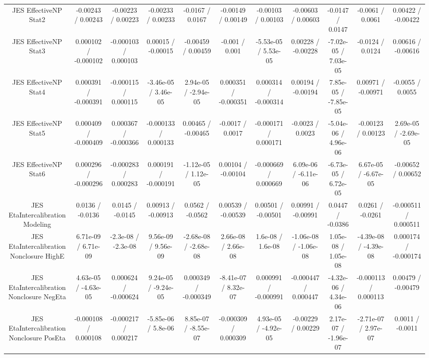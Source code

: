 \begin{table}[htbp]
\begin{center}
\begin{tabular}{|c|c|c|c|c|c|c|c|c|c|c|}
  JES EffectiveNP Stat2 & -0.00243 / 0.00243 & -0.00223 / 0.00223 & -0.00233 / 0.00233 & -0.0167 / 0.0167 & -0.00149 / 0.00149 & -0.00103 / 0.00103 & -0.00603 / 0.00603 & -0.0147 / 0.0147 & -0.0061 / 0.0061 & 0.00422 / -0.00422 \\ 
  JES EffectiveNP Stat3 & 0.000102 / -0.000102 & -0.000103 / 0.000103 & 0.00015 / -0.00015 & -0.00459 / 0.00459 & -0.001 / 0.001 & -5.53e-05 / 5.53e-05 & 0.00228 / -0.00228 & -7.02e-05 / 7.03e-05 & -0.0124 / 0.0124 & 0.00616 / -0.00616 \\ 
  JES EffectiveNP Stat4 & 0.000391 / -0.000391 & -0.000115 / 0.000115 & -3.46e-05 / 3.46e-05 & 2.94e-05 / -2.94e-05 & 0.000351 / -0.000351 & 0.000314 / -0.000314 & 0.00194 / -0.00194 & 7.85e-05 / -7.85e-05 & 0.00971 / -0.00971 & -0.0055 / 0.0055 \\ 
  JES EffectiveNP Stat5 & 0.000409 / -0.000409 & 0.000367 / -0.000366 & -0.000133 / 0.000133 & 0.00465 / -0.00465 & -0.0017 / 0.0017 & -0.000171 / 0.000171 & -0.0023 / 0.0023 & -5.04e-06 / 4.96e-06 & -0.00123 / 0.00123 & 2.69e-05 / -2.69e-05 \\ 
  JES EffectiveNP Stat6 & 0.000296 / -0.000296 & -0.000283 / 0.000283 & 0.000191 / -0.000191 & -1.12e-05 / 1.12e-05 & 0.00104 / -0.00104 & -0.000669 / 0.000669 & 6.09e-06 / -6.11e-06 & -6.73e-05 / 6.72e-05 & 6.67e-05 / -6.67e-05 & -0.00652 / 0.00652 \\ 
  JES EtaIntercalibration Modeling & 0.0136 / -0.0136 & 0.0145 / -0.0145 & 0.00913 / -0.00913 & 0.0562 / -0.0562 & 0.00539 / -0.00539 & 0.00501 / -0.00501 & 0.00991 / -0.00991 & 0.0447 / -0.0386 & 0.0261 / -0.0261 & -0.000511 / 0.000511 \\ 
  JES EtaIntercalibration Nonclosure HighE & 6.71e-09 / 6.71e-09 & -2.3e-08 / -2.3e-08 & 9.56e-09 / 9.56e-09 & -2.68e-08 / -2.68e-08 & 2.66e-08 / 2.66e-08 & 1.6e-08 / 1.6e-08 & -1.06e-08 / -1.06e-08 & 1.05e-08 / 1.05e-08 & -4.39e-08 / -4.39e-08 & 0.000174 / -0.000174 \\ 
  JES EtaIntercalibration Nonclosure NegEta & 4.63e-05 / -4.63e-05 & 0.000624 / -0.000624 & 9.24e-05 / -9.24e-05 & 0.000349 / -0.000349 & -8.41e-07 / 8.32e-07 & 0.000991 / -0.000991 & -0.000447 / 0.000447 & -4.32e-06 / 4.34e-06 & -0.000113 / 0.000113 & 0.00479 / -0.00479 \\ 
  JES EtaIntercalibration Nonclosure PosEta & -0.000108 / 0.000108 & -0.000217 / 0.000217 & -5.85e-06 / 5.8e-06 & 8.85e-07 / -8.55e-07 & -0.000309 / 0.000309 & 4.93e-05 / -4.92e-05 & -0.00229 / 0.00229 & 2.17e-07 / -1.96e-07 & -2.71e-07 / 2.97e-07 & 0.0011 / -0.0011 \\ 

\end{tabular}
\end{center}
\end{table}
